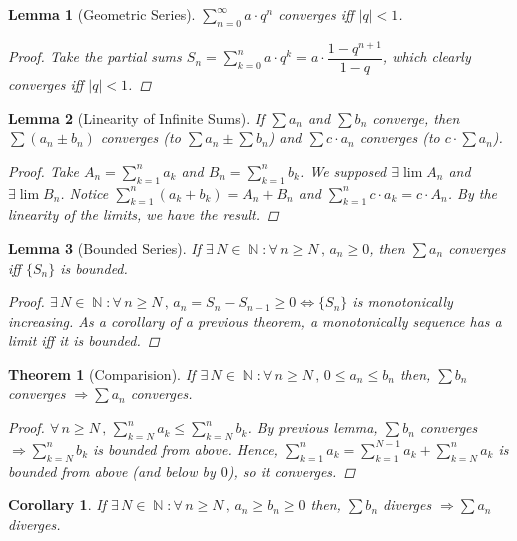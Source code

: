 \documentclass[12pt]{article}
\let\RA\Rightarrow
\let\LR\Leftrightarrow
\newcommand{\Forall}[1]{\forall\,{#1}\,,\,}
\newcommand{\Exist}[1]{\exists\,{#1}:}
\DeclareMathOperator{\N}{\mathbb{N}}
\newtheorem{theorem}{Theorem}[subsection]
\newtheorem{lemma}{Lemma}[subsection]
\newtheorem{corollary}{Corollary}[subsection]
\begin{document}
\begin{lemma}[Geometric Series]
  $\sum_{n=0}^\infty a\cdot q^n$ converges iff $|q|<1$.
  \begin{proof}
    Take the partial sums $S_n=\sum_{k=0}^n a\cdot q^k=a\cdot \dfrac{1-q^{n+1}}{1-q}$, which clearly converges iff $|q|<1$.
  \end{proof}
\end{lemma}

\begin{lemma}[Linearity of Infinite Sums]
  If $\sum a_n$ and $\sum b_n$ converge, then $\sum (a_n\pm b_n)$ converges (to $\sum a_n \pm\sum b_n$) and $\sum c\cdot a_n$ converges (to $c\cdot\sum a_n$).
  \begin{proof}
    Take $A_n=\sum_{k=1}^n a_k$ and $B_n=\sum_{k=1}^n b_k$. We supposed $\exists\lim A_n$ and $\exists\lim B_n$. Notice $\sum_{k=1}^n(a_k+b_k)=A_n+B_n$ and $\sum_{k=1}^n c\cdot a_k=c\cdot A_n$. By the linearity of the limits, we have the result.
  \end{proof}
\end{lemma}

\begin{lemma}[Bounded Series]
  If $\Exist{N\in\N}\Forall{n\geq N} a_n \geq 0$, then $\sum a_n$ converges iff $\{S_n\}$ is bounded.
  \begin{proof}
    $\Exist{N\in\N}\Forall{n\geq N} a_n=S_n-S_{n-1} \geq 0\LR \{S_n\}$ is monotonically increasing. As a corollary of a previous theorem, a monotonically sequence has a limit iff it is bounded.
  \end{proof}
\end{lemma}

\begin{theorem}[Comparision]
  If $\Exist{N\in\N}\Forall{n\geq N}0\leq a_n\leq b_n$ then, $\sum b_n$ converges $\RA\sum a_n$ converges.
  \begin{proof}
    $\Forall{n\geq N}\sum_{k=N}^n a_k\leq \sum_{k=N}^n b_k$. By previous lemma, $\sum b_n$ converges $\RA\sum_{k=N}^n b_k$ is bounded from above. Hence, $\sum_{k=1}^n a_k=\sum_{k=1}^{N-1}a_k+\sum_{k=N}^n a_k$ is bounded from above (and below by $0$), so it converges.
  \end{proof}
\end{theorem}

\begin{corollary}
  If $\Exist{N\in\N}\Forall{n\geq N}a_n\geq b_n\geq 0$ then, $\sum b_n$ diverges $\RA\sum a_n$ diverges.
\end{corollary}
\end{document}
